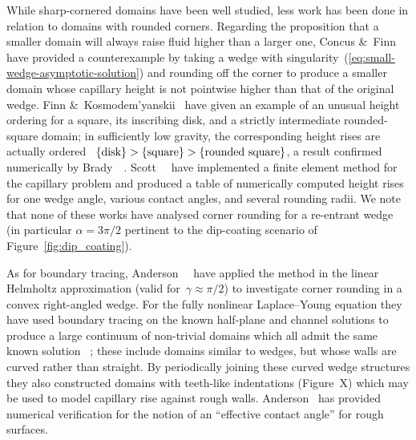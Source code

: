 While sharp-cornered domains have been well studied,
less work has been done in relation to domains with rounded corners.
Regarding the proposition that
a smaller domain will always raise fluid higher than a larger one,
Concus \&~Finn~\cite{concus-1976-height-capillary-surface}
have provided a counterexample
by taking a wedge with singularity~(\ref{eq:small-wedge-asymptotic-solution})
and rounding off the corner
to produce a smaller domain whose capillary height
is not pointwise higher than that of the original wedge.
Finn \&~Kosmodem'yanskii~%
  \cite{finn-2002-unusual-comparison-properties-capillary}
have given an example of an unusual height ordering
for a square, its inscribing disk,
and a strictly intermediate rounded-square domain;
in sufficiently low gravity,
the corresponding height rises are actually ordered~%
$\left\{\textnormal{disk}\right\} > \left\{\textnormal{square}\right\} > \left\{\textnormal{rounded square}\right\}$,
a result confirmed numerically
by Brady~\etal~\cite{brady-2003-capillary-rise-nesting-cylinders}.
Scott~\etal~\cite{scott-2005-computation-capillary-laplace-young}
have implemented a finite element method for the capillary problem
and produced a table of numerically computed height rises
for one wedge angle, various contact angles, and several rounding radii.
We note that none of these works
have analysed corner rounding for a re-entrant wedge
(in particular $\alpha = 3\pi/2$ pertinent to the dip-coating scenario
of Figure~\ref{fig:dip_coating}).

As for boundary tracing,
Anderson~\etal~\cite{anderson-2007-boundary-tracing-ii-applications}
have applied the method in the linear Helmholtz approximation
(valid for~$\gamma \approx \pi/2$)
to investigate corner rounding in a convex right-angled wedge.
For the fully nonlinear Laplace--Young equation
they have used boundary tracing
on the known half-plane and channel solutions
to produce a large continuum of non-trivial domains
which all admit the same known solution~%
  \cite{anderson-2006-exact-solutions-laplace-young};
these include domains similar to wedges,
but whose walls are curved rather than straight.
By periodically joining these curved wedge structures
they also constructed domains with teeth-like indentations
(Figure~X) %
which may be used to model capillary rise against rough walls.
Anderson~\cite{anderson-2002-thesis-boundary-tracing-pdes}
has provided numerical verification
for the notion of an ``effective contact angle'' for rough surfaces.


